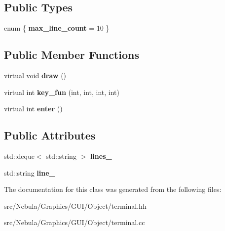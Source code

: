\subsection*{\-Public \-Types}
\begin{DoxyCompactItemize}
\item 
enum \{ {\bfseries max\-\_\-line\-\_\-count} =  10
 \}
\end{DoxyCompactItemize}
\subsection*{\-Public \-Member \-Functions}
\begin{DoxyCompactItemize}
\item 
\hypertarget{classNeb_1_1Graphics_1_1GUI_1_1Object_1_1terminal_a689e68d93a74938ae014a9d2782d87b9}{virtual void {\bfseries draw} ()}\label{classNeb_1_1Graphics_1_1GUI_1_1Object_1_1terminal_a689e68d93a74938ae014a9d2782d87b9}

\item 
\hypertarget{classNeb_1_1Graphics_1_1GUI_1_1Object_1_1terminal_ab67374e101b8763b0911fe843e9c352c}{virtual int {\bfseries key\-\_\-fun} (int, int, int, int)}\label{classNeb_1_1Graphics_1_1GUI_1_1Object_1_1terminal_ab67374e101b8763b0911fe843e9c352c}

\item 
\hypertarget{classNeb_1_1Graphics_1_1GUI_1_1Object_1_1terminal_a20be1259d8655d559ac164a33a5b1089}{virtual int {\bfseries enter} ()}\label{classNeb_1_1Graphics_1_1GUI_1_1Object_1_1terminal_a20be1259d8655d559ac164a33a5b1089}

\end{DoxyCompactItemize}
\subsection*{\-Public \-Attributes}
\begin{DoxyCompactItemize}
\item 
\hypertarget{classNeb_1_1Graphics_1_1GUI_1_1Object_1_1terminal_a575944793e4475450574cc727442403d}{std\-::deque$<$ std\-::string $>$ {\bfseries lines\-\_\-}}\label{classNeb_1_1Graphics_1_1GUI_1_1Object_1_1terminal_a575944793e4475450574cc727442403d}

\item 
\hypertarget{classNeb_1_1Graphics_1_1GUI_1_1Object_1_1terminal_a5da7355088690c2e8b8b76a5faa68ce0}{std\-::string {\bfseries line\-\_\-}}\label{classNeb_1_1Graphics_1_1GUI_1_1Object_1_1terminal_a5da7355088690c2e8b8b76a5faa68ce0}

\end{DoxyCompactItemize}


\-The documentation for this class was generated from the following files\-:\begin{DoxyCompactItemize}
\item 
src/\-Nebula/\-Graphics/\-G\-U\-I/\-Object/terminal.\-hh\item 
src/\-Nebula/\-Graphics/\-G\-U\-I/\-Object/terminal.\-cc\end{DoxyCompactItemize}
